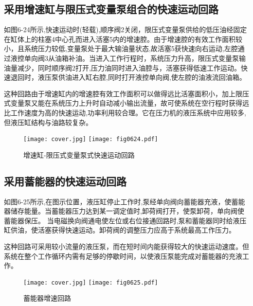 \subsection{采用增速缸与限压式变量泵组合的快速运动回路}

如图6-24所示,快速运动时(轻载),顺序阀2关闭，限压式变量泵供给的低压油经固定在缸体上的柱塞4中心孔而进入活塞5内的增速腔\uppercase\expandafter{}。由于增速腔\uppercase\expandafter{}的有效工作面积较小，且系统压力较低,变量泵处于最大输油量状态,故活塞5获快速向右运动,左腔\uppercase\expandafter{}通过液控单向阀3从油箱补油。当进入工作行程时，系统压力升高，限压式变量泵输油量减少，同时顺序阀2打开,压力油同时进入油腔\uppercase\expandafter{}与\uppercase\expandafter{}，活塞获得低速工作运动。快速退回时，液压泵供油进入缸右腔\uppercase\expandafter{},同时打开液控单向阀,使左腔\uppercase\expandafter{}的油液流回油箱。

这种回路由于增速缸内的增速腔有效工作面积可以做得远比活塞面积小，加上限压式变量泵又能在系统压力上升时自动减小输出流量，故可使系统在空行程时获得远比工作速度为高的快速运动,功率利用较合理。它在压力机的液压系统中应用较多,但液压缸结构与油路较复杂。

\begin{figure}
\centering
\ifOpenSource
\texttt{[image: cover.jpg]}
\else
\texttt{[image: fig0624.pdf]}
\fi
\caption{增速缸-限压式变量泵式快速运动回路}
\label{fig:fig0624}
\end{figure}

\subsection{采用蓄能器的快速运动回路}

如图6-25所示,在图示位置，液压缸停止工作时,泵经单向阀向蓄能器充液，使蓄能器储存能量。当蓄能器压力达到某一调定值时,卸荷阀打开，使泵卸荷，单向阀使蓄能器保压。 当电磁换向阀通电使左位或右位接通回路时,泵和蓄能器同时给液压缸供油，使活塞获得快速运动。卸荷阀的调整压力应高于系统最高工作压力。

这种回路可采用较小流量的液压泵，而在短时间内能获得较大的快速运动速度。但系统在整个工作循环内需有足够的停歇时间，以使液压泵能完成对蓄能器的充液工作。

\begin{figure}
\centering
\ifOpenSource
\texttt{[image: cover.jpg]}
\else
\texttt{[image: fig0625.pdf]}
\fi
\caption{蓄能器增速回路}
\label{fig:fig0625}
\end{figure}

